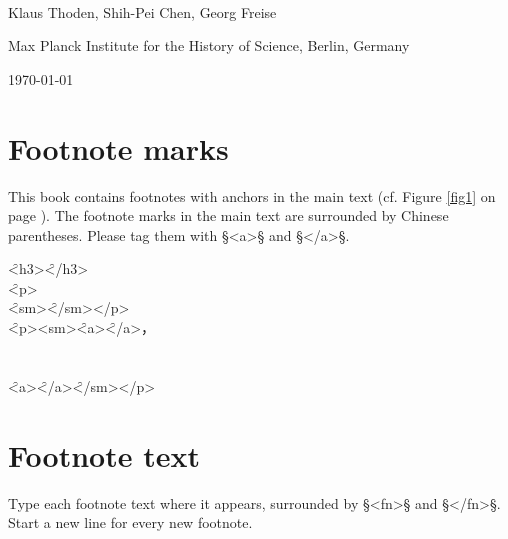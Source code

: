 \documentclass[fontsize=11pt, paper=a4, 
  DIV15,
  normalheadings,
  parskip=half-, 
  pointlessnumbers]{scrartcl}
\begin{document}


\begin{center}
  {} \\[5mm]
  \large Klaus Thoden, Shih-Pei Chen, Georg Freise

  \normalsize Max Planck Institute for the History of Science, Berlin, Germany

  \today
\end{center}

\section{Footnote marks}
\begin{mainrule}
  This book contains footnotes with anchors in the main text (cf. Figure \ref{fig1} on page \pageref{fig1}). The
  footnote marks in the main text are surrounded by Chinese
  parentheses. Please tag them with §<a>§ and §</a>§.
\end{mainrule}

\begin{typeChinese}
  \f{<h3>}\f{</h3>}\\
  \f{<p>}\\
  \f{<sm>}\f{</sm></p>}\\
  \f{<p><sm>}\f{<a>}\f{</a>，}\\
  \\
  \\
  \f{<a>}\f{</a>}\f{</sm></p>}
\end{typeChinese}

\section{Footnote text}
\begin{mainrule}
  Type each footnote text where it appears, surrounded by §<fn>§ and
  §</fn>§. Start a new line for every new footnote.
\end{mainrule}
\vspace{3mm}
\end{document}
